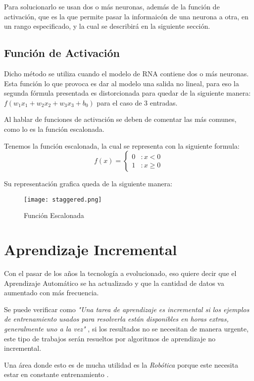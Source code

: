     Para solucionarlo se usan dos o más neuronas, además de la función de activación, que es la que permite pasar la informaicón de una neurona a otra, en un rango especificado, y la cual se describirá en la siguiente sección.

    \subsection{Función de Activación}

      Dicho método se utiliza cuando el modelo de RNA contiene dos o más neuronas.
      Esta función lo que provoca es dar al modelo una salida no lineal, para eso la segunda fórmula presentada es distorcionada para quedar de la siguiente manera: $f( w_1x_1 + w_2x_2 + w_3x_3 + b_0)$ para el caso de 3 entradas.
      
      Al hablar de funciones de activación se deben de comentar las más comunes, como lo es la función escalonada.

      Tenemos la función escalonada, la cual se representa con la siguiente formula: 
      \[f(x) = \left\{ \begin{array}{lr} 0 & : x < 0\\ 1 & : x \ge 0 \end{array} \right. \]

      Su representación grafica queda de la siguiente manera:
      \begin{figure}[H]
        \centering
        \texttt{[image: staggered.png]}
        \caption{Función Escalonada}
        \label{fig:Función Escalonada}
      \end{figure}
  \section{Aprendizaje Incremental}
    Con el pasar de los años la tecnología a evolucionado, eso quiere decir que el Aprendizaje Automático se ha actualizado y que la cantidad de datos va aumentado con más frecuencia.
    
    Se puede verificar como \textit{"Una tarea de aprendizaje es incremental si los ejemplos de entrenamiento usados para resolverla están disponibles en horas extras, generalmente uno a la vez"} \cite{GiraudCarrier2000}, si los resultados no se necesitan de manera urgente, este tipo de trabajos serán resueltos por algoritmos de aprendizaje no incremental. 

    Una área donde esto es de mucha utilidad es la \textit{Rob\'otica} porque este necesita estar en constante entrenamiento \cite{GiraudCarrier2000}.

